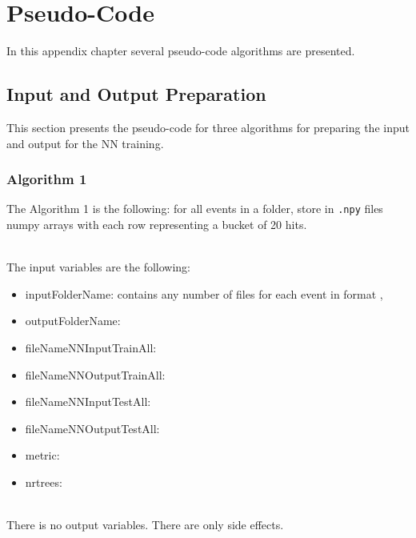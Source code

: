 \chapter{Pseudo-Code}
\label{chapter:PseudoCode}

In this appendix chapter several pseudo-code algorithms are presented. 

\section{Input and Output Preparation}
\label{sec:AppendixPseudoCodeInputOutput}

This section presents the pseudo-code for three algorithms for preparing the input and output for the NN training.

\subsection{Algorithm 1}

The Algorithm 1 is the following: for all events in a folder, store in \texttt{.npy} files numpy arrays with each row representing a bucket of 20 hits.

\ \\The input variables are the following:
\begin{itemize}
\item inputFolderName: contains any number of files for each event in format , 
\item outputFolderName:
\item fileNameNNInputTrainAll: 
\item fileNameNNOutputTrainAll: 
\item fileNameNNInputTestAll: 
\item fileNameNNOutputTestAll: 
\item metric: 
\item nrtrees: 
\end{itemize}

\ \\There is no output variables. There are only side effects.

